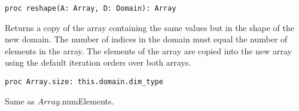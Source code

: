 \begin{protohead}
\begin{verbatim}
proc reshape(A: Array, D: Domain): Array
\end{verbatim}
\end{protohead}
\begin{protobody}
Returns a copy of the array containing the same values but in the
shape of the new domain.  The number of indices in the domain must
equal the number of elements in the array.  The elements of the array
are copied into the new array using the default iteration orders over
both arrays.
\end{protobody}

\begin{protohead}
\begin{verbatim}
proc Array.size: this.domain.dim_type
\end{verbatim}
\end{protohead}
\begin{protobody}
Same as $Array$.numElements.
\end{protobody}
